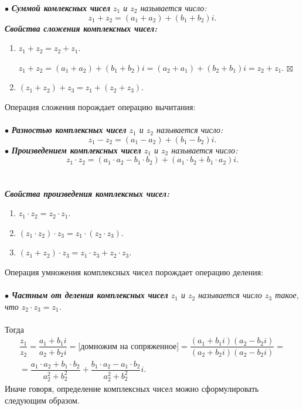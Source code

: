 \documentclass[a4paper, 12pt]{report}
\newenvironment{Proof} %
{\par\noindent{\textit{Доказательство.}\\}} %
{\hfill$\scriptstyle\boxtimes$}
\begin{document}
$\bullet$ \textit{\textbf{Суммой комлексных чисел} $z_1$ и $z_2$ называется число: $$z_1 + z_2 = (a_1 + a_2) + (b_1 + b_2) i.$$}
\textbf{\textit{Свойства сложения комплексных чисел:}}\begin{enumerate}
	\item $z_1 + z_2 = z_2 + z_1$. \begin{Proof}
		$z_1 + z_2 = (a_1 + a_2) + (b_1 + b_2) i = (a_2 + a_1) + (b_2 + b_1) i = z_2 + z_1$.
	\end{Proof}
	\item $(z_1 + z_2) + z_3 = z_1 + (z_2 + z_3)$.
\end{enumerate}
Операция сложения порождает операцию вычитания:\\\\
$\bullet$ \textit{\textbf{Разностью комплексных чисел} $z_1$ и $z_2$ называется число: $$z_1 - z_2 = (a_1 - a_2) + (b_1 - b_2) i.$$ }
$\bullet$ \textit{\textbf{Произведением комплексных чисел} $z_1$ и $z_2$ называется число: $$z_1 \cdot z_2 = (a_1 \cdot a_2 - b_1 \cdot b_2) + (a_1 \cdot b_2 + b_1 \cdot a_2) i.$$ }\\\\
\textbf{\textit{Свойства произведения комплексных чисел:}}\begin{enumerate}
	\item $z_1\cdot z_2 = z_2\cdot z_1$.
	\item $(z_1\cdot z_2)\cdot z_3 = z_1\cdot (z_2\cdot z_3)$.
	\item $(z_1 + z_2)\cdot z_3 = z_1\cdot z_3 + z_2 \cdot z_3$.
\end{enumerate}
Операция умножения комплексных чисел порождает операцию деления:\\\\
$\bullet$ \textit{\textbf{Частным от деления комплексных чисел} $z_1$ и $z_2$ называется число $z_3$ такое, что $z_2 \cdot z_3 = z_1$. }\\\\
Тогда \begin{multline*}
	\dfrac{z_1}{z_2} = \dfrac{a_1 + b_1 i}{a_2 + b_2 i} = \text{[домножим на сопряженное]} = \dfrac{(a_1 + b_1 i)(a_2 - b_2 i)}{(a_2 + b_2 i)(a_2 - b_2 i)}=\\= \dfrac{a_1\cdot a_2 + b_1 \cdot b_2}{a_2^2 + b_2 ^ 2} + \dfrac{b_1 \cdot a_2 - a_1 \cdot b_2}{a_2^2 + b_2^2}i.
\end{multline*}
Иначе говоря, определение комплексных чисел можно сформулировать следующим образом.\\\\
\end{document}
